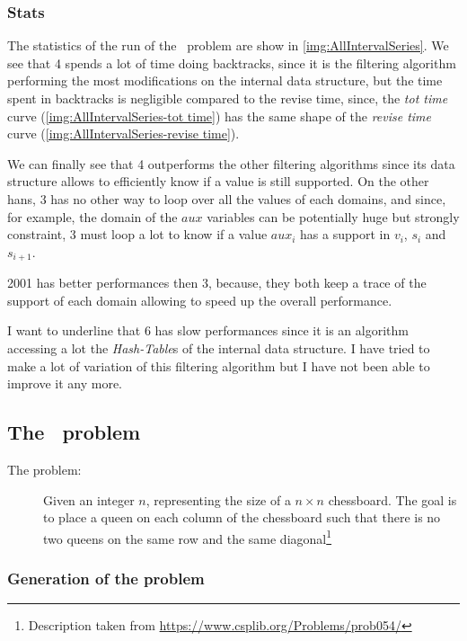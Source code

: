 \documentclass{rapport}
\begin{document}
\subsubsection{Stats}


The statistics of the run of the \allint\ problem are show in \cref{img:AllIntervalSeries}. We see that \ac{4} spends a lot of time doing backtracks, since it is the filtering algorithm performing the most modifications on the internal data structure, but the time spent in backtracks is negligible compared to the revise time, since, the \textit{tot time} curve (\cref{img:AllIntervalSeries-tot time}) has the same shape of the \textit{revise time} curve (\cref{img:AllIntervalSeries-revise time}).

We can finally see that \ac{4} outperforms the other filtering algorithms since its data structure allows to efficiently know if a value is still supported. On the other hans, \ac{3} has no other way to loop over all the values of each domains, and since, for example, the domain of the $aux$ variables can be potentially huge but strongly constraint, \ac{3} must loop a lot to know if a value $aux_i$ has a support in $v_i$, $s_i$ and $s_{i+1}$.

\ac{2001} has better performances then \ac{3}, because, they both keep a trace of the support of each domain allowing to speed up the overall performance.

I want to underline that \ac{6} has slow performances since it is an algorithm accessing a lot the \textit{Hash-Table}s of the internal data structure. I have tried to make a lot of variation of this filtering algorithm but I have not been able to improve it any more.

\subsection{The \queens\ problem}

\begin{description}
  \item[The problem:] Given an integer $n$, representing the size of a $n \times n$ chessboard. The goal is to place a queen on each column of the chessboard such that there is no two queens on the same row and the same diagonal\footnote{Description taken from \url{https://www.csplib.org/Problems/prob054/}}
\end{description}

\subsubsection{Generation of the problem}
\end{document}
